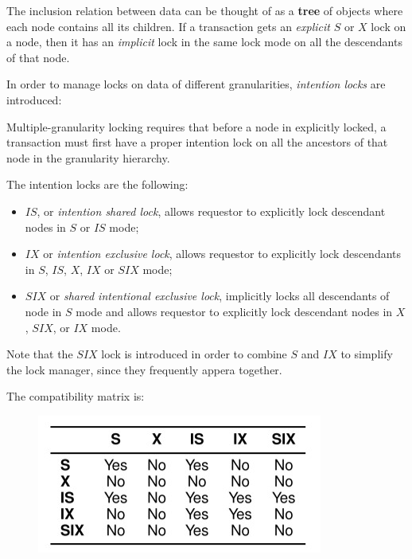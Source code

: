 The inclusion relation between data can be thought of as a \textbf{tree} of objects where each node contains all its children. If a transaction gets an \textit{explicit} $S$ or $X$ lock on a node, then it has an \textit{implicit} lock in the same lock mode on all the descendants of that node.

In order to manage locks on data of different granularities, \textit{intention locks} are introduced: 

\begin{tcolorbox}[title = Multiple-granularity and intention locks]
    Multiple-granularity locking requires that before a node in explicitly locked, a transaction must first have a proper intention lock on all the ancestors of that node in the granularity hierarchy. 
\end{tcolorbox}

The intention locks are the following:

\begin{itemize}

    \item $IS$, or \textit{intention shared lock}, allows requestor to explicitly lock descendant nodes in $S$ or $IS$ mode;

    \item $IX$ or \textit{intention exclusive lock}, allows requestor to explicitly lock descendants in $S$, $IS$, $X$, $IX$ or $SIX$ mode;
    
    \item $SIX$ or \textit{shared intentional exclusive lock}, implicitly locks all descendants of node in $S$ mode and allows requestor to explicitly lock descendant nodes in $X$, $SIX$, or $IX$ mode.
    
\end{itemize}

Note that the $SIX$ lock is introduced in order to combine $S$ and $IX$ to simplify the lock manager, since they frequently appera together.

The compatibility matrix is:

\begin{figure}[h!]
		\centering
		\includegraphics[scale = 1.5]{img/conc7.jpg}
		\label{conc5}
\end{figure}

